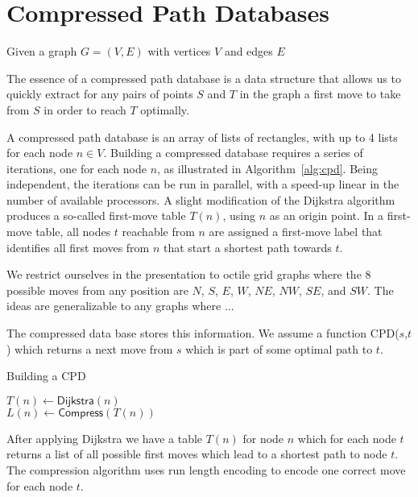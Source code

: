 \section{Compressed Path Databases}

Given a graph $G = (V,E)$ with vertices $V$ and edges $E$

The essence of a compressed path database is a data structure
that allows us to
quickly extract for any pairs of points $S$ and $T$
in the graph a
first move to take from $S$ in order to reach $T$ optimally.


A compressed path
database is an array of lists of rectangles, with up to 4 lists
for each node $n \in V$.
Building a compressed database requires
a series of iterations, one for each node $n$, as illustrated
in Algorithm~\ref{alg:cpd}.
Being independent, the iterations can
be run in parallel, with a speed-up linear in the number of
available processors. A slight modification of the Dijkstra
algorithm produces a so-called first-move table $T(n)$,
using $n$ as an origin point.
In a first-move table, all nodes $t$
reachable from $n$ are assigned a first-move label
that identifies all first moves from $n$
that start a shortest path towards $t$.


We restrict ourselves in the presentation to octile
grid graphs where the 8 possible moves from any position are
$N$, $S$, $E$, $W$, $NE$, $NW$, $SE$, and $SW$.
The ideas are generalizable to any graphs where ...

The compressed data base stores this information.
We assume a function \textsf{CPD}($s$,$t$) which returns a
next move from $s$ which is part of some optimal path to $t$.

\begin{algorithm}
  \caption{Building a CPD}
  \label{alg:cpd}
      { $T(n) \gets \textsf{Dijkstra}(n)$ \\
        $L(n) \gets \textsf{Compress}(T(n))$ }
\end{algorithm}

After applying \textsf{Dijkstra} we have a table
$T(n)$ for node $n$ which for each node $t$
returns a list of all possible first moves
which lead to a shortest path to node $t$.
The compression algorithm uses run length encoding
to encode one correct move for each node $t$.


